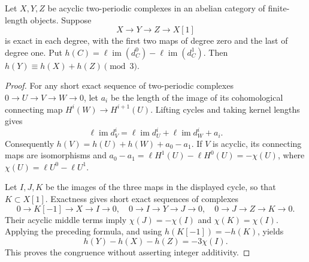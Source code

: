 \begin{lemma}
\label{C:three_cycle_length}
Let $X,Y,Z$ be acyclic two-periodic complexes in an abelian category
of finite-length objects. Suppose
\[
 X\longrightarrow Y\longrightarrow Z\longrightarrow X[1]
\]
is exact in each degree, with the first two maps of degree zero
and the last of degree one. Put
$h(C)=\ell\operatorname{im}(d_C^0)-\ell\operatorname{im}(d_C^1)$.
Then $h(Y)\equiv h(X)+h(Z)\pmod3$.
\end{lemma}
\begin{proof}
For any short exact sequence of two-periodic complexes
$0\to U\to V\to W\to0$, let $a_i$ be the length of the image
of its cohomological connecting map
$H^i(W)\to H^{i+1}(U)$. Lifting cycles and taking kernel lengths
gives
\[
 \ell\operatorname{im}d_V^i
  =\ell\operatorname{im}d_U^i+
    \ell\operatorname{im}d_W^i+a_i.
\]
Consequently $h(V)=h(U)+h(W)+a_0-a_1$.
If $V$ is acyclic, its connecting maps are isomorphisms and
$a_0-a_1=\ell H^1(U)-\ell H^0(U)=-\chi(U)$, where
$\chi(U)=\ell U^0-\ell U^1$.

Let $I,J,K$ be the images of the three maps in the displayed
cycle, so that $K\subset X[1]$. Exactness gives short exact
sequences of complexes
\[
 0\to K[-1]\to X\to I\to0,\quad
 0\to I\to Y\to J\to0,\quad
 0\to J\to Z\to K\to0.
\]
Their acyclic middle terms imply
$\chi(J)=-\chi(I)$ and $\chi(K)=\chi(I)$.
Applying the preceding formula, and using
$h(K[-1])=-h(K)$, yields
\[
 h(Y)-h(X)-h(Z)=-3\chi(I).
\]
This proves the congruence without asserting integer additivity.
\end{proof}

